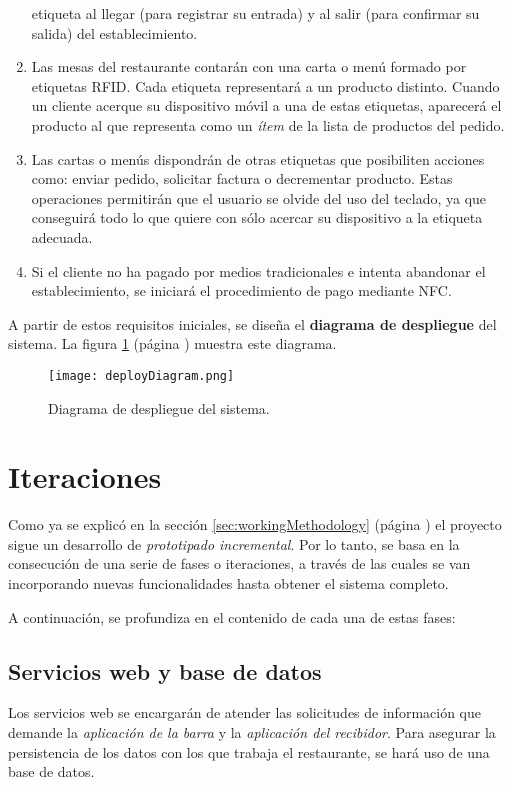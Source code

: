\begin{enumerate}
etiqueta al llegar (para registrar su entrada) y al salir (para confirmar
su salida) del establecimiento.
\item Las mesas del restaurante contarán con una carta o menú formado por
etiquetas \acs{RFID}. Cada etiqueta representará a un producto distinto.
Cuando un cliente acerque su dispositivo móvil a una de estas etiquetas,
aparecerá el producto al que representa como un \emph{ítem} de la lista de
productos del pedido.
\item Las cartas o menús dispondrán de otras etiquetas que posibiliten acciones
como: enviar pedido, solicitar factura o decrementar producto. Estas
operaciones permitirán que el usuario se olvide del uso del teclado, ya que
conseguirá todo lo que quiere con sólo acercar su dispositivo a la etiqueta
adecuada.
\item Si el cliente no ha pagado por medios tradicionales e intenta abandonar
el establecimiento, se iniciará el procedimiento de pago mediante \acs{NFC}.
\end{enumerate}

A partir de estos requisitos iniciales, se diseña el \textbf{diagrama de
despliegue} del sistema. La figura \ref{fig:deployDiagram} (página
\pageref{fig:deployDiagram}) muestra este diagrama.

  \begin{figure}[h]
    \begin{center}
      \texttt{[image: deployDiagram.png]}
      \caption{Diagrama de despliegue del sistema.}
      \label{fig:deployDiagram}
    \end{center}
  \end{figure}

\section{Iteraciones}
Como ya se explicó en la sección \ref{sec:workingMethodology} (página
\pageref{sec:workingMethodology}) el proyecto sigue un desarrollo de
\emph{prototipado incremental}. Por lo tanto, se basa en la consecución de una
serie de fases o iteraciones, a través de las cuales se van incorporando nuevas
funcionalidades hasta obtener el sistema completo.

A continuación, se profundiza en el contenido de cada una de estas fases:

\subsection{Servicios web y base de datos}
Los servicios web se encargarán de atender las solicitudes de información que
demande la \emph{aplicación de la barra} y la \emph{aplicación del recibidor}.
Para asegurar la persistencia de los datos con los que trabaja el restaurante,
se hará uso de una base de datos.

